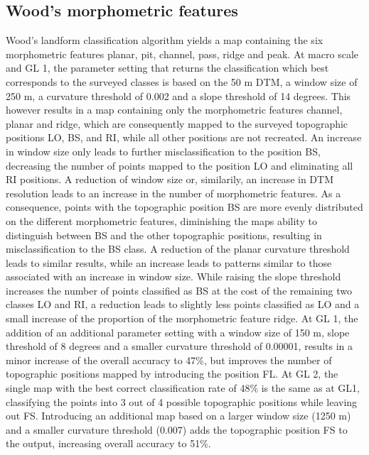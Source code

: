 \documentclass[preprint,12pt,authoryear]{elsarticle}
\begin{document}
\subsection{Wood's morphometric features}
Wood's landform classification algorithm yields a map containing the six morphometric features planar, pit, channel, pass, ridge and peak. 
At macro scale and GL 1, the parameter setting that returns the classification which best corresponds to the surveyed classes is based on the 50 m DTM, a window size of 250 m, a curvature threshold of 0.002 and a slope threshold of 14 degrees. This however results in a map containing only the morphometric features channel, planar and ridge, which are consequently mapped to the surveyed topographic positions LO, BS, and RI, while all other positions are not recreated. An increase in window size only leads to further misclassification to the position BS, decreasing the number of points mapped to the position LO and eliminating all RI positions. A reduction of window size or, similarily, an increase in DTM resolution leads to an increase in the number of morphometric features. As a consequence, points with the topographic position BS are more evenly distributed on the different morphometric features, diminishing the maps ability to distinguish between BS and the other topographic positions, resulting in misclassification to the BS class. A reduction of the planar curvature threshold leads to similar results, while an increase leads to patterns similar to those associated with an increase in window size. While raising the slope threshold increases the number of points classified as BS at the cost of the remaining two classes LO and RI, a reduction leads to slightly less points classified as LO and a small increase of the proportion of the morphometric feature ridge. At GL 1, the addition of an additional parameter setting with a window size of 150 m, slope threshold of 8 degrees and a smaller curvature threshold of 0.00001, results in a minor increase of the overall accuracy to 47\%, but improves the number of topographic positions mapped by introducing the position FL. At GL 2, the single map with the best correct classification rate of 48\% is the same as at GL1, classifying the points into 3 out of 4 possible  topographic positions while leaving out FS. Introducing an additional map based on a larger window size (1250 m) and a smaller curvature threshold (0.007) adds the topographic position FS to the output, increasing overall accuracy to 51\%.
\end{document}
